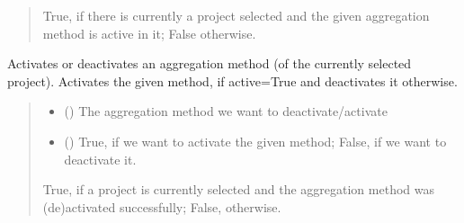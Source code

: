 \documentclass[letterpaper,10pt,english]{sphinxmanual}
\begin{document}
\begin{fulllineitems}
\begin{fulllineitems}
\begin{quote}
\begin{description}
\sphinxAtStartPar
True, if there is currently a project selected and the given aggregation method is active in it; False otherwise.

\sphinxAtStartPar
{}

\end{description}\end{quote}

\end{fulllineitems}


\begin{fulllineitems}
\label{\detokenize{apidoc/src.osm_configurator.control:src.osm_configurator.control.control_interface.IControl.set_aggregation_method_active}}
\pysigstartsignatures
{}
\pysigstopsignatures
\sphinxAtStartPar
Activates or deactivates an aggregation method (of the currently selected project).
Activates the given method, if active=True and deactivates it otherwise.
\begin{quote}\begin{description}
\begin{itemize}
\item {} 
\sphinxAtStartPar
{} ({\hyperref[\detokenize{apidoc/src.osm_configurator.model.project.calculation:src.osm_configurator.model.project.calculation.aggregation_method_enum.AggregationMethod}]{}}) \textendash{} The aggregation method we want to deactivate/activate

\item {} 
\sphinxAtStartPar
{} () \textendash{} True, if we want to activate the given method; False, if we want to deactivate it.

\end{itemize}

\sphinxAtStartPar
True, if a project is currently selected and the aggregation method was (de\sphinxhyphen{})activated successfully; False, otherwise.


\end{description}
\end{quote}
\end{fulllineitems}
\end{fulllineitems}
\end{document}
